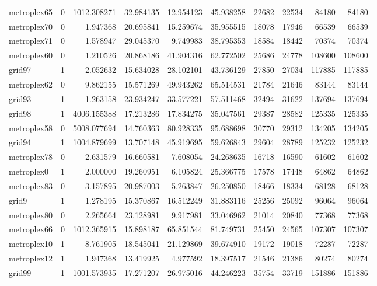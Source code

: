 \begin{longtable}{|l|r|r|r|r|r|r|r|r|r|}
metroplex65 & 0 & 1012.308271 & 32.984135 & 12.954123 & 45.938258 & 22682 & 22534 & 84180 & 84180 \\
metroplex70 & 0 & 1.947368 & 20.695841 & 15.259674 & 35.955515 & 18078 & 17946 & 66539 & 66539 \\
metroplex71 & 0 & 1.578947 & 29.045370 & 9.749983 & 38.795353 & 18584 & 18442 & 70374 & 70374 \\
metroplex60 & 0 & 1.210526 & 20.868186 & 41.904316 & 62.772502 & 25686 & 24778 & 108600 & 108600 \\
grid97 & 1 & 2.052632 & 15.634028 & 28.102101 & 43.736129 & 27850 & 27034 & 117885 & 117885 \\
metroplex62 & 0 & 9.862155 & 15.571269 & 49.943262 & 65.514531 & 21784 & 21646 & 83144 & 83144 \\
grid93 & 1 & 1.263158 & 23.934247 & 33.577221 & 57.511468 & 32494 & 31622 & 137694 & 137694 \\
grid98 & 1 & 4006.155388 & 17.213286 & 17.834275 & 35.047561 & 29387 & 28582 & 125335 & 125335 \\
metroplex58 & 0 & 5008.077694 & 14.760363 & 80.928335 & 95.688698 & 30770 & 29312 & 134205 & 134205 \\
grid94 & 1 & 1004.879699 & 13.707148 & 45.919695 & 59.626843 & 29604 & 28789 & 125232 & 125232 \\
metroplex78 & 0 & 2.631579 & 16.660581 & 7.608054 & 24.268635 & 16718 & 16590 & 61602 & 61602 \\
metroplex0 & 1 & 2.000000 & 19.260951 & 6.105824 & 25.366775 & 17578 & 17448 & 64862 & 64862 \\
metroplex83 & 0 & 3.157895 & 20.987003 & 5.263847 & 26.250850 & 18466 & 18334 & 68128 & 68128 \\
grid9 & 1 & 1.278195 & 15.370867 & 16.512249 & 31.883116 & 25256 & 25092 & 96064 & 96064 \\
metroplex80 & 0 & 2.265664 & 23.128981 & 9.917981 & 33.046962 & 21014 & 20840 & 77368 & 77368 \\
metroplex66 & 0 & 1012.365915 & 15.898187 & 65.851544 & 81.749731 & 25450 & 24565 & 107307 & 107307 \\
metroplex10 & 1 & 8.761905 & 18.545041 & 21.129869 & 39.674910 & 19172 & 19018 & 72287 & 72287 \\
metroplex12 & 1 & 1.947368 & 13.419925 & 4.977592 & 18.397517 & 21546 & 21386 & 80274 & 80274 \\
grid99 & 1 & 1001.573935 & 17.271207 & 26.975016 & 44.246223 & 35754 & 33719 & 151886 & 151886 \\

\end{longtable}
